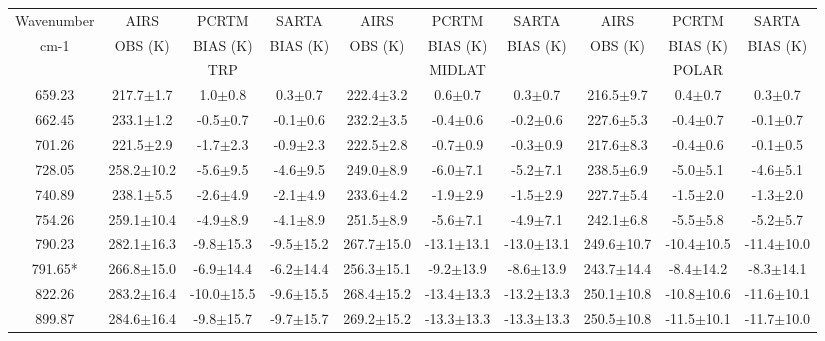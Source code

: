 \documentclass[agupp]{aguplus}              %
\begin{document}
\begin{article}
\begin{center}
\begin{table}[ht]
{\footnotesize
\hfill{}
\begin{tabular}{c|ccc|ccc|ccc} %
Wavenumber & AIRS   & PCRTM    & SARTA    & AIRS   & PCRTM    & SARTA    & AIRS   & PCRTM    & SARTA \\
cm-1       & OBS (K)& BIAS (K) & BIAS (K) & OBS (K)& BIAS (K) & BIAS (K) & OBS (K)& BIAS (K) & BIAS (K) \\
           &        & TRP      &          &        & MIDLAT   &          &        & POLAR    &       \\
\hline
659.23 & 217.7$\pm$1.7 &  1.0$\pm$0.8 &  0.3$\pm$0.7 & 222.4$\pm$3.2 &  0.6$\pm$0.7 &  0.3$\pm$0.7 & 216.5$\pm$9.7 &  0.4$\pm$0.7 &  0.3$\pm$0.7 \\ 
662.45 & 233.1$\pm$1.2 & -0.5$\pm$0.7 & -0.1$\pm$0.6 & 232.2$\pm$3.5 & -0.4$\pm$0.6 & -0.2$\pm$0.6 & 227.6$\pm$5.3 & -0.4$\pm$0.7 & -0.1$\pm$0.7 \\ 
701.26 & 221.5$\pm$2.9 & -1.7$\pm$2.3 & -0.9$\pm$2.3 & 222.5$\pm$2.8 & -0.7$\pm$0.9 & -0.3$\pm$0.9 & 217.6$\pm$8.3 & -0.4$\pm$0.6 & -0.1$\pm$0.5 \\ 
728.05 & 258.2$\pm$10.2 & -5.6$\pm$9.5 & -4.6$\pm$9.5 & 249.0$\pm$8.9 & -6.0$\pm$7.1 & -5.2$\pm$7.1 & 238.5$\pm$6.9 & -5.0$\pm$5.1 & -4.6$\pm$5.1 \\ 
740.89 & 238.1$\pm$5.5 & -2.6$\pm$4.9 & -2.1$\pm$4.9 & 233.6$\pm$4.2 & -1.9$\pm$2.9 & -1.5$\pm$2.9 & 227.7$\pm$5.4 & -1.5$\pm$2.0 & -1.3$\pm$2.0 \\ 
754.26 & 259.1$\pm$10.4 & -4.9$\pm$8.9 & -4.1$\pm$8.9 & 251.5$\pm$8.9 & -5.6$\pm$7.1 & -4.9$\pm$7.1 & 242.1$\pm$6.8 & -5.5$\pm$5.8 & -5.2$\pm$5.7 \\ 
790.23 & 282.1$\pm$16.3 & -9.8$\pm$15.3 & -9.5$\pm$15.2 & 267.7$\pm$15.0 & -13.1$\pm$13.1 & -13.0$\pm$13.1 & 249.6$\pm$10.7 & -10.4$\pm$10.5 & -11.4$\pm$10.0 \\ 
791.65* & 266.8$\pm$15.0 & -6.9$\pm$14.4 & -6.2$\pm$14.4 & 256.3$\pm$15.1 & -9.2$\pm$13.9 & -8.6$\pm$13.9 & 243.7$\pm$14.4 & -8.4$\pm$14.2 & -8.3$\pm$14.1 \\ 
\hline
822.26 & 283.2$\pm$16.4 & -10.0$\pm$15.5 & -9.6$\pm$15.5 & 268.4$\pm$15.2 & -13.4$\pm$13.3 & -13.2$\pm$13.3 & 250.1$\pm$10.8 & -10.8$\pm$10.6 & -11.6$\pm$10.1 \\ 
899.87 & 284.6$\pm$16.4 & -9.8$\pm$15.7 & -9.7$\pm$15.7 & 269.2$\pm$15.2 & -13.3$\pm$13.3 & -13.3$\pm$13.3 & 250.5$\pm$10.8 & -11.5$\pm$10.1 & -11.7$\pm$10.0 \\ 

\end{tabular}}
\end{table}
\end{center}
\end{article}
\end{document}
